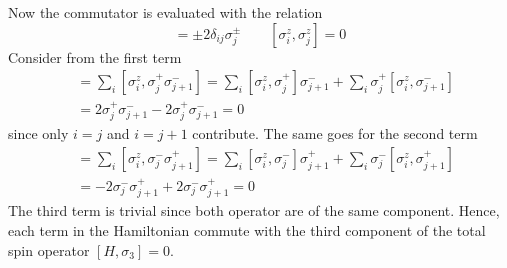 \documentclass[../../../main.tex]{subfiles}
\begin{document}
Now  the commutator is evaluated with the relation
\begin{equation*}
    [\sigma_i^z,\sigma_j^{\pm}] = \pm 2\delta_{ij}\sigma_j^{\pm}\qquad
    [\sigma_i^z,\sigma_j^z] = 0
\end{equation*}
Consider from the first term
\begin{align*}
    [\sigma_3, \sigma_j^{+}\sigma_{j+1}^{-}]
     & =  \sum_i [\sigma_i^z, \sigma_j^{+}\sigma_{j+1}^{-}]
    =\sum_{i}  [\sigma_i^z, \sigma_j^{+}]\sigma_{j+1}^{-} +  \sum_{i}\sigma_j^{+}[\sigma_{i}^z, \sigma_{j+1}^{-}] \\
     & =  2\sigma_j^{+}\sigma_{j+1}^{-} -  2\sigma_j^{+}\sigma_{j+1}^{-} = 0
\end{align*}
since only $i=j$ and $i=j+1$ contribute.
The same goes for the second term
\begin{align*}
    [\sigma_3, \sigma_j^{-}\sigma_{j+1}^{+}]
     & =  \sum_i [\sigma_i^z, \sigma_j^{-}\sigma_{j+1}^{+}]
    =\sum_{i}  [\sigma_i^z, \sigma_j^{-}]\sigma_{j+1}^{+} +  \sum_{i}\sigma_j^{-}[\sigma_{i}^z, \sigma_{j+1}^{+}] \\
     & =  - 2\sigma_j^{-}\sigma_{j+1}^{+} +  2\sigma_j^{-}\sigma_{j+1}^{+} = 0
\end{align*}
The third term is trivial since both operator are of the same component.
Hence, each term in the Hamiltonian commute with the third component of the total spin operator $ [H,\sigma_3]=0$.
\end{document}
